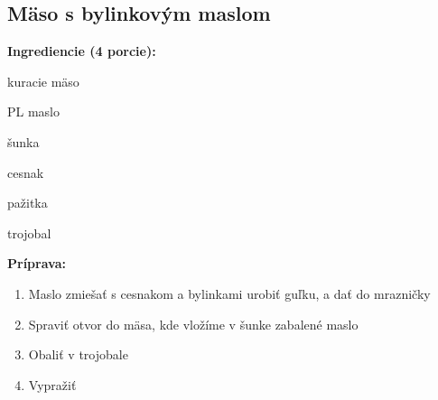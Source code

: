 \setcounter{step}{0}

\subsection{ Mäso s bylinkovým maslom }

\begin{ingredient}
  
  \def\portions{  }
  \textbf{ {\normalsize Ingrediencie (4 porcie):} }

  \begin{main}
      \item kuracie mäso
      \item PL maslo
      \item šunka
      \item cesnak
      \item pažitka
      \item trojobal
  \end{main}
  
\end{ingredient}
\begin{recipe}
\textbf{ {\normalsize Príprava:} }
\begin{enumerate}

  \item{Maslo zmiešať s cesnakom a bylinkami urobiť guľku, a dať do mrazničky}
  \item{Spraviť otvor do mäsa, kde vložíme v šunke zabalené maslo}
  \item{Obaliť v trojobale}
  \item{Vypražiť}

\end{enumerate}
\end{recipe}

\begin{notes}
  
\end{notes}	
\clearpage
